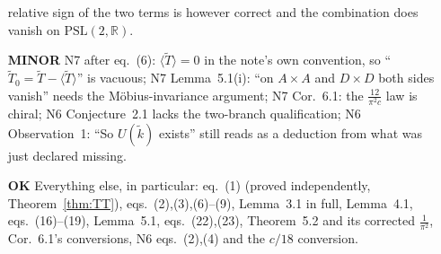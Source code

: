 \documentclass[11pt]{article}
\begin{document}
\begin{enumerate}[leftmargin=1.6em]
relative sign of the two terms is however correct and the combination does vanish on $\mathrm{PSL}(2,\mathbb R)$.
\item[\textbf{MINOR}] N7 after eq.~(6): $\langle\widetilde T\rangle=0$ in the note's own convention, so
``$\widetilde T_0=\widetilde T-\langle\widetilde T\rangle$'' is vacuous; N7 Lemma~5.1(i): ``on $A\times A$ and
$D\times D$ both sides vanish'' needs the M\"obius-invariance argument; N7 Cor.~6.1: the $\frac{12}{\pi^2c}$ law
is chiral; N6 Conjecture~2.1 lacks the two-branch qualification; N6 Observation~1: ``So $U(\widetilde k)$
exists'' still reads as a deduction from what was just declared missing.
\item[\textbf{OK}] Everything else, in particular: eq.~(1) (proved independently, Theorem~\ref{thm:TT}),
eqs.~(2),(3),(6)--(9), Lemma~3.1 in full, Lemma~4.1, eqs.~(16)--(19), Lemma~5.1, eqs.~(22),(23), Theorem~5.2 and
its corrected $\frac1{\pi^2}$, Cor.~6.1's conversions, N6 eqs.~(2),(4) and the $c/18$ conversion.
\end{enumerate}
\end{document}

